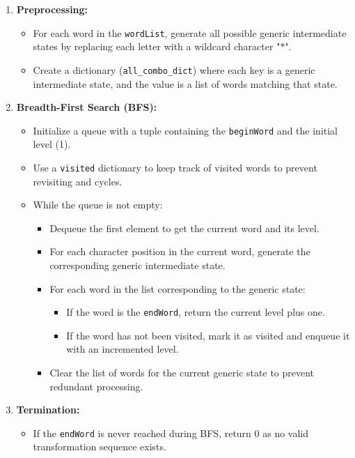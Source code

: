 \begin{enumerate}
    \item \textbf{Preprocessing:}
    \begin{itemize}
        \item For each word in the \texttt{wordList}, generate all possible generic intermediate states by replacing each letter with a wildcard character "\(*\)".
        \item Create a dictionary (\texttt{all\_combo\_dict}) where each key is a generic intermediate state, and the value is a list of words matching that state.
    \end{itemize}
    
    \item \textbf{Breadth-First Search (BFS):}
    \begin{itemize}
        \item Initialize a queue with a tuple containing the \texttt{beginWord} and the initial level (1).
        \item Use a \texttt{visited} dictionary to keep track of visited words to prevent revisiting and cycles.
        \item While the queue is not empty:
        \begin{itemize}
            \item Dequeue the first element to get the current word and its level.
            \item For each character position in the current word, generate the corresponding generic intermediate state.
            \item For each word in the list corresponding to the generic state:
            \begin{itemize}
                \item If the word is the \texttt{endWord}, return the current level plus one.
                \item If the word has not been visited, mark it as visited and enqueue it with an incremented level.
            \end{itemize}
            \item Clear the list of words for the current generic state to prevent redundant processing.
        \end{itemize}
    \end{itemize}
    
    \item \textbf{Termination:}
    \begin{itemize}
        \item If the \texttt{endWord} is never reached during BFS, return \(0\) as no valid transformation sequence exists.
    \end{itemize}
\end{enumerate}

